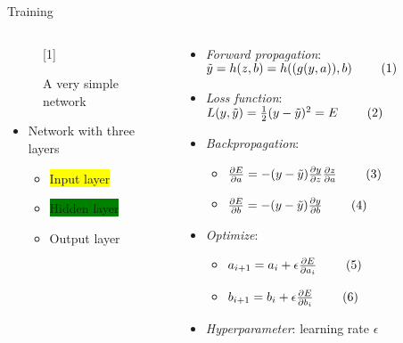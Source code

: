 \documentclass[usenames,dvipsnames,Nike,mathserif]{tuberlinbeamer}
\newcommand\inlineeqno{\stepcounter{equation}\ (\theequation)}
\begin{document}
\begin{frame}[fragile]{Training}
	\vspace{-2em}
	\begin{columns}
		\begin{column}{.5\textwidth}
			\begin{figure}
				\scalebox{1}[1]{}
				\caption{A very simple network}
			\end{figure}
			\begin{itemize}
			\item<1-> Network with three layers
			\begin{itemize}
				\item<2->\colorbox{yellow}{Input layer}
				\item<2-> \colorbox{green}{Hidden layer}
				\item<2-> \colorbox{BlueGreen}{Output layer}
			\end{itemize}
		\end{itemize}
		\end{column}
	\begin{column}{.5\textwidth}
		\begin{itemize}
			\item<3-> \emph{Forward propagation}: $\tilde{y}=h(z,b)=h((g(y,a)),b) \qquad\inlineeqno$ 
			\item<4-> \emph{Loss function}: $L(y,\tilde{y})=
			\frac{1}{2}(y - \tilde{y})^2 = E\qquad\inlineeqno$
			\item<5-> \emph{Backpropagation}:
			\begin{itemize}
				\item<6-> $\frac{\partial E}{\partial a} =
				-(y - \tilde{y})\frac{\partial y}{\partial z}\frac{\partial z}{\partial a}\qquad\inlineeqno$
				\item<6-> $\frac{\partial E}{\partial b} =
				-(y - \tilde{y})\frac{\partial y}{\partial b}\qquad\inlineeqno$ 
			\end{itemize} 
			\item<7-> \emph{Optimize}:
				\begin{itemize}
					\item<7->$a_{i+1}=a_i + \epsilon \frac{\partial E}{\partial a_i}\qquad\inlineeqno$
					\item<7->$b_{i+1}=b_i + \epsilon \frac{\partial E}{\partial b_i}\qquad\inlineeqno$
				\end{itemize}
			\item<8-> \emph{Hyperparameter}: learning rate $\epsilon$
		\end{itemize}
	\end{column}
	\end{columns}
\end{frame}
\end{document}
